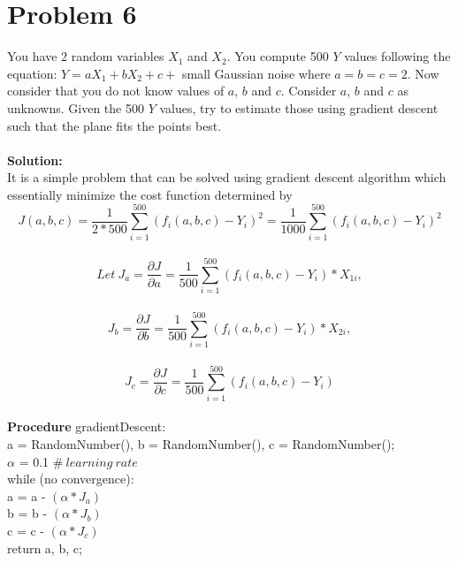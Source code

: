 \documentclass{article}
\newcommand\tab[1][4mm]{\hspace*{#1}}
\begin{document}
\section*{Problem 6}
You have 2 random variables $X_1$ and $X_2$. You compute 500 $Y$ values following the equation: $Y = aX_1 + bX_2 + c+$ small Gaussian noise where $a = b = c = 2$. Now consider that you do not know values of $a$, $b$ and $c$. Consider $a$, $b$ and $c$ as unknowns. Given the 500 $Y$ values, try to estimate those using gradient descent such that the plane fits the points best. \\
\vspace{1mm} \\
\textbf{Solution:} \\
It is a simple problem that can be solved using gradient descent algorithm which essentially minimize the cost function determined by \\
	\[ J(a, b, c) = \frac{1}{2*500} \sum_{i=1}^{500} (f_i(a, b, c) - Y_i)^2 = \frac{1}{1000} \sum_{i=1}^{500} (f_i(a, b, c) - Y_i)^2 \] \\
	 \[Let\ J_a = \frac{\partial J}{\partial a} = \frac{1}{500} \sum_{i=1}^{500} (f_i(a, b, c) - Y_i)*X_{1i}, \] \\
\[J_b = \frac{\partial J}{\partial b} = \frac{1}{500} \sum_{i=1}^{500} (f_i(a, b, c) - Y_i)*X_{2i}, \] \\
\[J_c = \frac{\partial J}{\partial c} = \frac{1}{500} \sum_{i=1}^{500} (f_i(a, b, c) - Y_i) \] \\
\textbf{Procedure} gradientDescent: \\
a = RandomNumber(), b = RandomNumber(), c = RandomNumber(); \\
$\alpha$ = 0.1 $\#\ learning\ rate$ \\
while (no convergence): \\
\tab a = a - $(\alpha * J_a)$ \\
\tab b = b - $(\alpha * J_b)$ \\
\tab c = c - $(\alpha * J_c)$ \\
return a, b, c;
\end{document}
